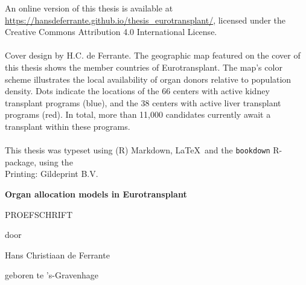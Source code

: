 \documentclass[11pt,twoside,]{book}
\begin{document}
An online version of this thesis is available at \url{https://hansdeferrante.github.io/thesis_eurotransplant/}, licensed under the Creative Commons Attribution 4.0 International License.
\\
\\
Cover design by H.C. de Ferrante. The geographic map featured on the cover of 
this thesis shows the member countries of Eurotransplant. The map's color 
scheme illustrates the local availability of organ donors relative to population
density. Dots indicate the locations of the 66 centers with active kidney transplant
programs (blue), and the 38 centers with active liver transplant programs (red). 
In total, more than 11,000 candidates currently await a transplant within these
programs.
\\
\\
This thesis was typeset using (R) Markdown, \LaTeX\ and the \verb+bookdown+ R-package,
using the 
\\ Printing: Gildeprint B.V.



\endgroup

\clearpage
\thispagestyle{empty}
\vspace*{\drop}
\begin{center}
\Huge\textbf{Organ allocation models in Eurotransplant}\par
\vfill %
\large \textsc{PROEFSCHRIFT}\par
\vspace{\baselineskip}
\par %
\vspace{\baselineskip}
{\large door}\par
\vspace{\baselineskip}
{\Large Hans Christiaan de Ferrante}\par
\vspace{\baselineskip}
{\large geboren te 's-Gravenhage}
\end{center}
\end{document}
